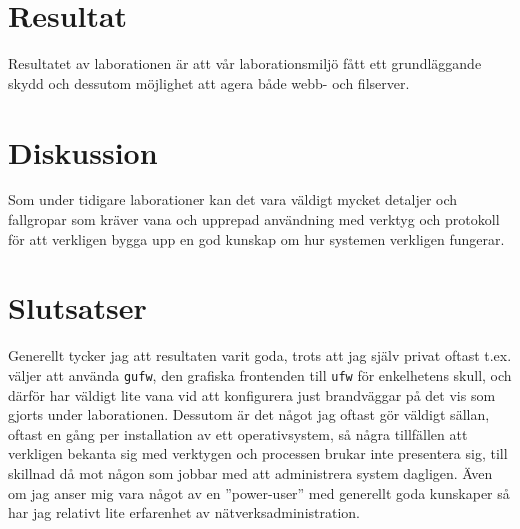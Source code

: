 %
%
%


\section{Resultat}
Resultatet av laborationen är att vår laborationsmiljö fått ett grundläggande
skydd och dessutom möjlighet att agera både webb- och filserver.

\section{Diskussion}
Som under tidigare laborationer kan det vara väldigt mycket detaljer och
fallgropar som kräver vana och upprepad användning med verktyg och protokoll
för att verkligen bygga upp en god kunskap om hur systemen verkligen fungerar.

\section{Slutsatser}
Generellt tycker jag att resultaten varit goda, trots att jag själv privat
oftast t.ex. väljer att använda \texttt{gufw}, den grafiska frontenden till
\texttt{ufw} för enkelhetens skull, och därför har väldigt lite vana vid att
konfigurera just brandväggar på det vis som gjorts under laborationen. Dessutom
är det något jag oftast gör väldigt sällan, oftast en gång per installation av
ett operativsystem, så några tillfällen att verkligen bekanta sig med verktygen
och processen brukar inte presentera sig, till skillnad då mot någon som jobbar
med att administrera system dagligen. Även om jag anser mig vara något av en
''power-user'' med generellt goda kunskaper så har jag relativt lite erfarenhet
av nätverksadministration.
